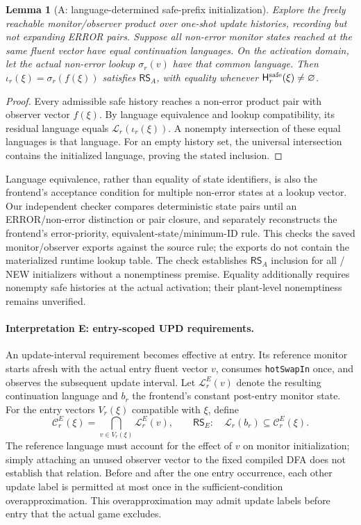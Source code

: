\documentclass[11pt]{article}
\newtheorem{lemma}{Lemma}[section]
\begin{document}
\begin{lemma}[A: language-determined safe-prefix initialization]
\label{lem:rs-a}
Explore the freely reachable monitor/observer product over one-shot update histories, recording but not expanding ERROR pairs. Suppose all non-error monitor states reached at the same fluent vector have equal continuation languages. On the activation domain, let the actual non-error lookup $\sigma_r(v)$ have that common language. Then $\iota_r(\xi)=\sigma_r(f(\xi))$ satisfies $\mathsf{RS}_A$, with equality whenever $\mathsf H_r^{\rm safe}(\xi)\ne\varnothing$.
\end{lemma}
\begin{proof}
Every admissible safe history reaches a non-error product pair with observer vector $f(\xi)$. By language equivalence and lookup compatibility, its residual language equals $\mathcal L_r(\iota_r(\xi))$. A nonempty intersection of these equal languages is that language. For an empty history set, the universal intersection contains the initialized language, proving the stated inclusion.
\end{proof}
Language equivalence, rather than equality of state identifiers, is also the frontend's acceptance condition for multiple non-error states at a lookup vector. Our independent checker compares deterministic state pairs until an ERROR/non-error distinction or pair closure, and separately reconstructs the frontend's error-priority, equivalent-state/minimum-ID rule. This checks the saved monitor/observer exports against the source rule; the exports do not contain the materialized runtime lookup table. The check establishes $\mathsf{RS}_A$ inclusion for all \RSAExactNew/\RSNewOccurrences{} NEW initializers without a nonemptiness premise. Equality additionally requires nonempty safe histories at the actual activation; their plant-level nonemptiness remains unverified.

\paragraph{Interpretation E: entry-scoped UPD requirements.}
An update-interval requirement becomes effective at entry. Its reference monitor starts afresh with the actual entry fluent vector $v$, consumes \texttt{hotSwapIn} once, and observes the subsequent update interval. Let $\mathcal L_r^E(v)$ denote the resulting continuation language and $b_r$ the frontend's constant post-entry monitor state. For the entry vectors $V_r(\xi)$ compatible with $\xi$, define
\[
 \mathcal C_r^E(\xi)=\bigcap_{v\in V_r(\xi)}\mathcal L_r^E(v),
 \qquad \mathsf{RS}_E:\quad
 \mathcal L_r(b_r)\subseteq\mathcal C_r^E(\xi).
\]
The reference language must account for the effect of $v$ on monitor initialization; simply attaching an unused observer vector to the fixed compiled DFA does not establish that relation. Before and after the one entry occurrence, each other update label is permitted at most once in the sufficient-condition overapproximation. This overapproximation may admit update labels before entry that the actual game excludes.
\end{document}
